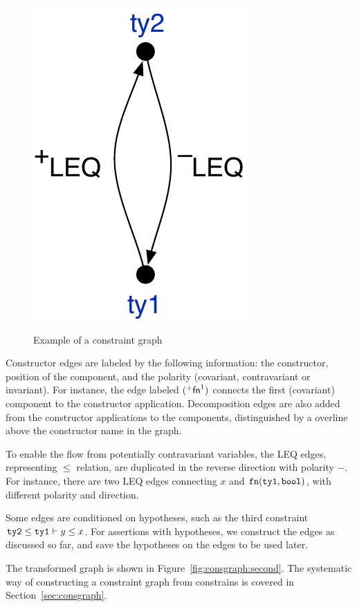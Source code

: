 \begin{figure}
\begin{center}
{    \includegraphics[height=\fh]{graph/hypograph}
    \label{fig:consgraph:third}
}
\end{center}
\caption{Example of a constraint graph}
\label{fig:consgraph}
\end{figure}

Constructor edges are labeled by the following information: the constructor,
position of the component, and the polarity (covariant, contravariant or
invariant). For instance, the edge labeled $(^{+}\textsf{fn}^{1})$
connects the first (covariant) component to the constructor
application.
%
Decomposition edges are also added from the constructor applications
to the components, distinguished by a overline above the constructor
name in the graph.

To enable the flow from potentially contravariant variables, the LEQ edges,
representing $\leq$ relation, are duplicated in the reverse direction with
polarity $-$. For instance, there are two LEQ edges connecting $x$ and
$\mathtt{fn}(\mathtt{ty1},\mathtt{bool})$, with different polarity and direction.

Some edges are conditioned on hypotheses, such as the third constraint
$\mathtt{ty2} \leq \mathtt{ty1} \vdash y \leq x$. For assertions with
hypotheses, we construct the edges as discussed so far, and save the
hypotheses on the edges to be used later.

The transformed graph is shown in Figure~\ref{fig:consgraph:second}. The
systematic way of constructing a constraint graph from constrains is covered in
Section~\ref{sec:consgraph}.

